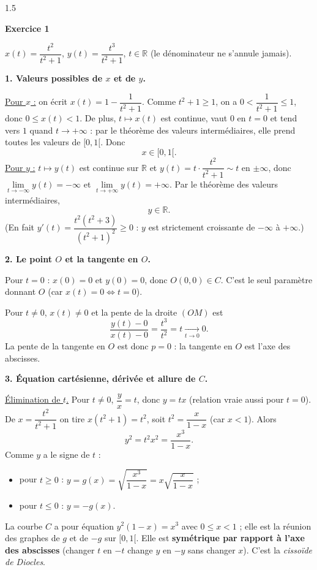 \documentclass[12pt]{article}
\begin{document}
\begin{spacing}{1.5}

\textbf{Exercice 1}

$x(t)=\dfrac{t^2}{t^2+1}$, \quad $y(t)=\dfrac{t^3}{t^2+1}$, \quad $t\in\mathbb{R}$ (le dénominateur ne s'annule jamais).

\textbf{1. Valeurs possibles de $x$ et de $y$.}

\underline{Pour $x$ :} on écrit $x(t)=1-\dfrac{1}{t^2+1}$. Comme $t^2+1\ge1$, on a $0<\dfrac1{t^2+1}\le1$, donc $0\le x(t)<1$. De plus, $t\mapsto x(t)$ est continue, vaut $0$ en $t=0$ et tend vers $1$ quand $t\to+\infty$ : par le théorème des valeurs intermédiaires, elle prend toutes les valeurs de $[0,1[$. Donc
\[
x\in[0,1[ .
\]
\underline{Pour $y$ :} $t\mapsto y(t)$ est continue sur $\mathbb{R}$ et $y(t)=t\cdot\dfrac{t^2}{t^2+1}\sim t$ en $\pm\infty$, donc $\lim\limits_{t\to-\infty}y(t)=-\infty$ et $\lim\limits_{t\to+\infty}y(t)=+\infty$. Par le théorème des valeurs intermédiaires,
\[
y\in\mathbb{R}.
\]
(En fait $y'(t)=\dfrac{t^2(t^2+3)}{(t^2+1)^2}\ge0$ : $y$ est strictement croissante de $-\infty$ à $+\infty$.)

\textbf{2. Le point $O$ et la tangente en $O$.}

Pour $t=0$ : $x(0)=0$ et $y(0)=0$, donc $O(0,0)\in C$. C'est le seul paramètre donnant $O$ (car $x(t)=0\iff t=0$).

Pour $t\neq0$, $x(t)\neq0$ et la pente de la droite $(OM)$ est
\[
\frac{y(t)-0}{x(t)-0}=\frac{t^3}{t^2}=t\xrightarrow[t\to0]{}0 .
\]
La pente de la tangente en $O$ est donc $\boxed{p=0}$ : la tangente en $O$ est l'axe des abscisses.


\textbf{3. Équation cartésienne, dérivée et allure de $C$.}

\underline{Élimination de $t$.} Pour $t\neq0$, $\dfrac yx=t$, donc $y=tx$ (relation vraie aussi pour $t=0$). De $x=\dfrac{t^2}{t^2+1}$ on tire $x(t^2+1)=t^2$, soit $t^2=\dfrac{x}{1-x}$ (car $x<1$). Alors
\[
y^2=t^2x^2=\frac{x^3}{1-x}.
\]
Comme $y$ a le signe de $t$ :
\begin{itemize}
\item pour $t\ge0$ : $y=g(x)=\sqrt{\dfrac{x^3}{1-x}}=x\sqrt{\dfrac{x}{1-x}}$ ;
\item pour $t\le0$ : $y=-g(x)$.
\end{itemize}
La courbe $C$ a pour équation $y^2(1-x)=x^3$ avec $0\le x<1$ ; elle est la réunion des graphes de $g$ et de $-g$ sur $[0,1[$. Elle est \textbf{symétrique par rapport à l'axe des abscisses} (changer $t$ en $-t$ change $y$ en $-y$ sans changer $x$). C'est la \emph{cissoïde de Diocles}.


\end{spacing}
\end{document}
